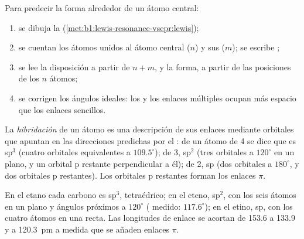\begin{method}\label{met:b1:lewis-resonance-vsepr:vsepr}
Para predecir la forma alrededor de un átomo central:
\begin{enumerate}
  \item se dibuja la  (\cref{met:b1:lewis-resonance-vsepr:lewis});
  \item se cuentan los átomos unidos al átomo central ($n$) y sus  ($m$); se escribe ;
  \item se lee la disposición a partir de $n + m$, y la forma, a partir de
        las posiciones de los $n$ átomos;
  \item se corrigen los ángulos ideales: los  y los
        enlaces múltiples ocupan más espacio que los enlaces sencillos.
\end{enumerate}
\end{method}

\begin{definition}[Hibridación]\label{def:b1:lewis-resonance-vsepr:hybridisation}
La \emph{hibridación} de un átomo es una
descripción de sus enlaces mediante orbitales que apuntan en las
direcciones predichas por el : de un átomo de 
4 se dice que es sp$^3$ (cuatro orbitales equivalentes a $109.5^\circ$);
de  3, sp$^2$ (tres orbitales a $120^\circ$ en un plano, y
un orbital p restante perpendicular a él); de  2, sp (dos
orbitales a $180^\circ$, y dos orbitales p restantes). Los orbitales p
restantes forman los enlaces $\pi$.
\end{definition}

\begin{example}\label{ex:b1:lewis-resonance-vsepr:carbon}
En el etano cada carbono es sp$^3$, tetraédrico; en el eteno, sp$^2$, con
los seis átomos en un plano y ángulos próximos a $120^\circ$ (
medido: $117.6^\circ$); en el etino, sp, con los cuatro átomos en una
recta. Las longitudes de enlace se acortan de 153.6 a 133.9 y a
\qty{120.3}{pm} a medida que se añaden enlaces $\pi$.
\end{example}

